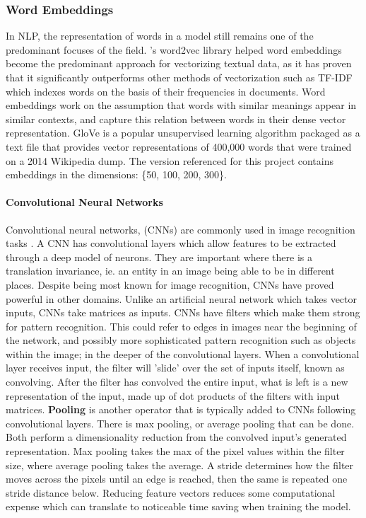 \documentclass[11pt]{article}
\begin{document}
\subsubsection{Word Embeddings}
In NLP, the representation of words in a model still remains one of the predominant focuses of the field. \textcolor{cite}{\cite{mikolov}}'s word2vec library helped word embeddings become the predominant approach for vectorizing textual data, as it has proven that it significantly outperforms other methods of vectorization such as TF-IDF which indexes words on the basis of their frequencies in documents. Word embeddings work on the assumption that words with similar meanings appear in similar contexts, and capture this relation between words in their dense vector representation.
\newline
GloVe \textcolor{cite}{\cite{glove}} is a popular unsupervised learning algorithm packaged as a text file that provides vector representations of 400,000 words that were trained on a 2014 Wikipedia dump. The version referenced for this project contains embeddings in the dimensions: \{50, 100, 200, 300\}. \\

\paragraph{Convolutional Neural Networks}
Convolutional neural networks, (CNNs) are commonly used in image recognition tasks \textcolor{cite}{\citet{imagecnn}}. A CNN has convolutional layers which allow features to be extracted through a deep model of neurons. They are important where there is a translation invariance, ie. an entity in an image being able to be in different places. Despite being most known for image recognition, CNNs have proved powerful in other domains.  
Unlike an artificial neural network which takes vector inputs, CNNs take matrices as inputs. 
CNNs have filters which make them strong for pattern recognition. This could refer to edges in images near the beginning of the network, and possibly more sophisticated pattern recognition such as objects within the image; in the deeper of the convolutional layers.   
When a convolutional layer receives input, the filter will 'slide' over the set of inputs itself, known as convolving. After the filter has convolved the entire input, what is left is a new representation of the input, made up of dot products of the filters with input matrices. 
\newline\textbf{Pooling} is another operator that is typically added to CNNs following convolutional layers. There is max pooling, or average pooling that can be done. Both perform a dimensionality reduction from the convolved input's generated representation. Max pooling takes the max of the pixel values within the filter size, where average pooling takes the average. A stride determines how the filter moves across the pixels until an edge is reached, then the same is repeated one stride distance below. Reducing feature vectors reduces some computational expense which can translate to noticeable time saving when training the model.     
\end{document}
